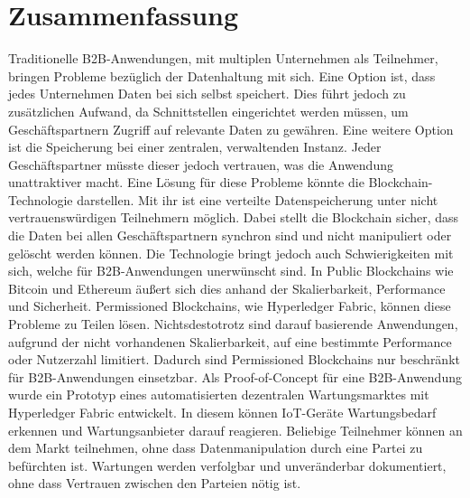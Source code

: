 \pagestyle{empty} %

\chapter*{Zusammenfassung} %
\label{cha:abtract}

Traditionelle B2B-Anwendungen, mit multiplen Unternehmen als Teilnehmer, bringen Probleme bezüglich der Datenhaltung mit sich. Eine Option ist, dass jedes Unternehmen Daten bei sich selbst speichert. Dies führt jedoch zu zusätzlichen Aufwand, da Schnittstellen eingerichtet werden müssen, um Geschäftspartnern Zugriff auf relevante Daten zu gewähren. Eine weitere Option ist die Speicherung bei einer zentralen, verwaltenden Instanz. Jeder Geschäftspartner müsste dieser jedoch vertrauen, was die Anwendung unattraktiver macht. Eine Lösung für diese Probleme könnte die Blockchain-Technologie darstellen. Mit ihr ist eine verteilte Datenspeicherung unter nicht vertrauenswürdigen Teilnehmern möglich. Dabei stellt die Blockchain sicher, dass die Daten bei allen Geschäftspartnern synchron sind und nicht manipuliert oder gelöscht werden können. Die Technologie bringt jedoch auch Schwierigkeiten mit sich, welche für B2B-Anwendungen unerwünscht sind. In Public Blockchains wie Bitcoin und Ethereum äußert sich dies anhand der Skalierbarkeit, Performance und Sicherheit. Permissioned Blockchains, wie Hyperledger Fabric, können diese Probleme zu Teilen lösen. Nichtsdestotrotz sind darauf basierende Anwendungen, aufgrund der nicht vorhandenen Skalierbarkeit, auf eine bestimmte Performance oder Nutzerzahl limitiert. Dadurch sind Permissioned Blockchains nur beschränkt für B2B-Anwendungen einsetzbar. Als Proof-of-Concept für eine B2B-Anwendung wurde ein Prototyp eines automatisierten dezentralen Wartungsmarktes mit Hyperledger Fabric entwickelt. In diesem können IoT-Geräte Wartungsbedarf erkennen und Wartungsanbieter darauf reagieren. Beliebige Teilnehmer können an dem Markt teilnehmen, ohne dass Datenmanipulation durch eine Partei zu befürchten ist. Wartungen werden verfolgbar und unveränderbar dokumentiert, ohne dass Vertrauen zwischen den Parteien nötig ist.
